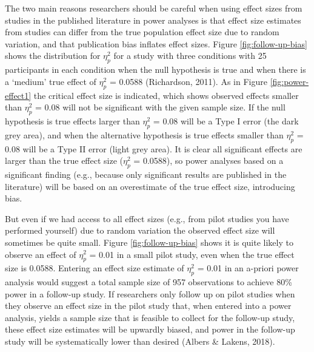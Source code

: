 \documentclass[
  english,
  ,jou, a4paper,floatsintext]{apa6}
\begin{document}
The two main reasons researchers should be careful when using effect sizes from studies in the published literature in power analyses is that effect size estimates from studies can differ from the true population effect size due to random variation, and that publication bias inflates effect sizes. Figure \ref{fig:follow-up-bias} shows the distribution for \(\eta_p^2\) for a study with three conditions with 25 participants in each condition when the null hypothesis is true and when there is a `medium' true effect of \(\eta_p^2\) = 0.0588 (Richardson, 2011). As in Figure \ref{fig:power-effect1} the critical effect size is indicated, which shows observed effects smaller than \(\eta_p^2\) = 0.08 will not be significant with the given sample size. If the null hypothesis is true effects larger than \(\eta_p^2\) = 0.08 will be a Type I error (the dark grey area), and when the alternative hypothesis is true effects smaller than \(\eta_p^2\) = 0.08 will be a Type II error (light grey area). It is clear all significant effects are larger than the true effect size (\(\eta_p^2\) = 0.0588), so power analyses based on a significant finding (e.g., because only significant results are published in the literature) will be based on an overestimate of the true effect size, introducing bias.

But even if we had access to all effect sizes (e.g., from pilot studies you have performed yourself) due to random variation the observed effect size will sometimes be quite small. Figure \ref{fig:follow-up-bias} shows it is quite likely to observe an effect of \(\eta_p^2\) = 0.01 in a small pilot study, even when the true effect size is 0.0588. Entering an effect size estimate of \(\eta_p^2\) = 0.01 in an a-priori power analysis would suggest a total sample size of 957 observations to achieve 80\% power in a follow-up study. If researchers only follow up on pilot studies when they observe an effect size in the pilot study that, when entered into a power analysis, yields a sample size that is feasible to collect for the follow-up study, these effect size estimates will be upwardly biased, and power in the follow-up study will be systematically lower than desired (Albers \& Lakens, 2018).
\end{document}
